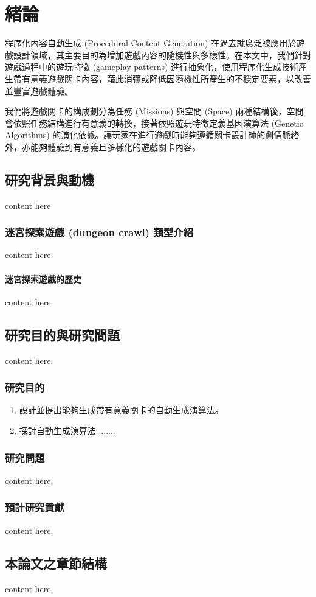\chapter{緒論}
\label{cha:intro}

程序化內容自動生成 (Procedural Content Generation) 在過去就廣泛被應用於遊戲設計領域，其主要目的為增加遊戲內容的隨機性與多樣性。在本文中，我們針對遊戲過程中的遊玩特徵 (gameplay patterns) 進行抽象化，使用程序化生成技術產生帶有意義遊戲關卡內容，藉此消彌或降低因隨機性所產生的不穩定要素，以改善並豐富遊戲體驗。

我們將遊戲關卡的構成劃分為任務 (Missions) 與空間 (Space) 兩種結構後，空間會依照任務結構進行有意義的轉換，接著依照遊玩特徵定義基因演算法 (Genetic Algorithms) 的演化依據。讓玩家在進行遊戲時能夠遵循關卡設計師的劇情脈絡外，亦能夠體驗到有意義且多樣化的遊戲關卡內容。

\section{研究背景與動機}

content here.

\subsection{迷宮探索遊戲 (dungeon crawl) 類型介紹}

content here.

\subsubsection{迷宮探索遊戲的歷史}

content here.


\section{研究目的與研究問題}

content here.

\subsection{研究目的}

\begin{enumerate}
  \item 設計並提出能夠生成帶有意義關卡的自動生成演算法。
  \item 探討自動生成演算法 .......
\end{enumerate}

\subsection{研究問題}

content here.

\subsection{預計研究貢獻}

content here.

\section{本論文之章節結構}

content here.

